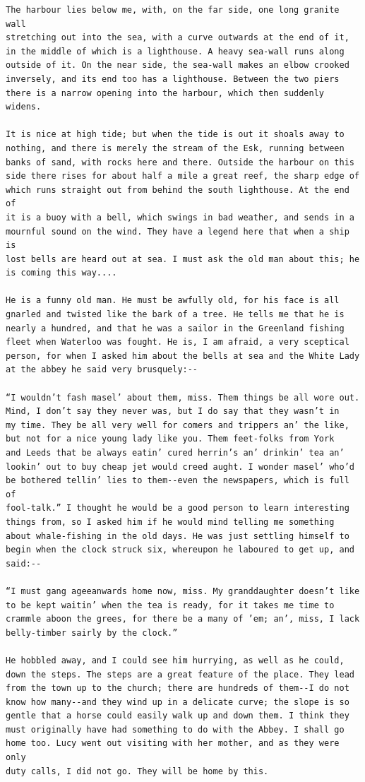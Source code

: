 \documentclass{article}
\begin{document}
\begin{verbatim}
The harbour lies below me, with, on the far side, one long granite wall
stretching out into the sea, with a curve outwards at the end of it,
in the middle of which is a lighthouse. A heavy sea-wall runs along
outside of it. On the near side, the sea-wall makes an elbow crooked
inversely, and its end too has a lighthouse. Between the two piers
there is a narrow opening into the harbour, which then suddenly widens.

It is nice at high tide; but when the tide is out it shoals away to
nothing, and there is merely the stream of the Esk, running between
banks of sand, with rocks here and there. Outside the harbour on this
side there rises for about half a mile a great reef, the sharp edge of
which runs straight out from behind the south lighthouse. At the end of
it is a buoy with a bell, which swings in bad weather, and sends in a
mournful sound on the wind. They have a legend here that when a ship is
lost bells are heard out at sea. I must ask the old man about this; he
is coming this way....

He is a funny old man. He must be awfully old, for his face is all
gnarled and twisted like the bark of a tree. He tells me that he is
nearly a hundred, and that he was a sailor in the Greenland fishing
fleet when Waterloo was fought. He is, I am afraid, a very sceptical
person, for when I asked him about the bells at sea and the White Lady
at the abbey he said very brusquely:--

“I wouldn’t fash masel’ about them, miss. Them things be all wore out.
Mind, I don’t say they never was, but I do say that they wasn’t in
my time. They be all very well for comers and trippers an’ the like,
but not for a nice young lady like you. Them feet-folks from York
and Leeds that be always eatin’ cured herrin’s an’ drinkin’ tea an’
lookin’ out to buy cheap jet would creed aught. I wonder masel’ who’d
be bothered tellin’ lies to them--even the newspapers, which is full of
fool-talk.” I thought he would be a good person to learn interesting
things from, so I asked him if he would mind telling me something
about whale-fishing in the old days. He was just settling himself to
begin when the clock struck six, whereupon he laboured to get up, and
said:--

“I must gang ageeanwards home now, miss. My granddaughter doesn’t like
to be kept waitin’ when the tea is ready, for it takes me time to
crammle aboon the grees, for there be a many of ’em; an’, miss, I lack
belly-timber sairly by the clock.”

He hobbled away, and I could see him hurrying, as well as he could,
down the steps. The steps are a great feature of the place. They lead
from the town up to the church; there are hundreds of them--I do not
know how many--and they wind up in a delicate curve; the slope is so
gentle that a horse could easily walk up and down them. I think they
must originally have had something to do with the Abbey. I shall go
home too. Lucy went out visiting with her mother, and as they were only
duty calls, I did not go. They will be home by this.


\end{verbatim}
\end{document}
